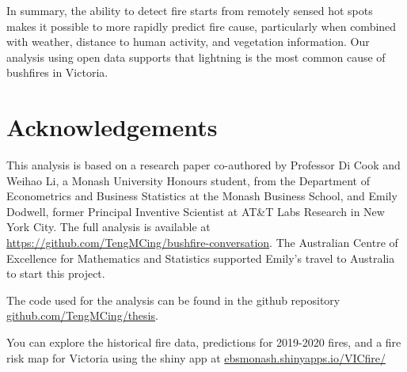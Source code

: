 \documentclass[
  11pt,
  a4paper,
]{article}
\begin{document}
In summary, the ability to detect fire starts from remotely sensed hot spots makes it possible to more rapidly predict fire cause, particularly when combined with weather, distance to human activity, and vegetation information. Our analysis using open data supports that lightning is the most common cause of bushfires in Victoria.

\hypertarget{acknowledgements}{%
\section{Acknowledgements}\label{acknowledgements}}

This analysis is based on a research paper co-authored by Professor Di Cook and Weihao Li, a Monash University Honours student, from the Department of Econometrics and Business Statistics at the Monash Business School, and Emily Dodwell, former Principal Inventive Scientist at AT\&T Labs Research in New York City. The full analysis is available at \url{https://github.com/TengMCing/bushfire-conversation}. The Australian Centre of Excellence for Mathematics and Statistics supported Emily's travel to Australia to start this project.

The code used for the analysis can be found in the github repository \href{https://github.com/TengMCing/thesis}{github.com/TengMCing/thesis}.

You can explore the historical fire data, predictions for 2019-2020 fires, and a fire risk map for Victoria using the shiny app at \href{https://ebsmonash.shinyapps.io/VICfire/}{ebsmonash.shinyapps.io/VICfire/}

\printbibliography
\end{document}
